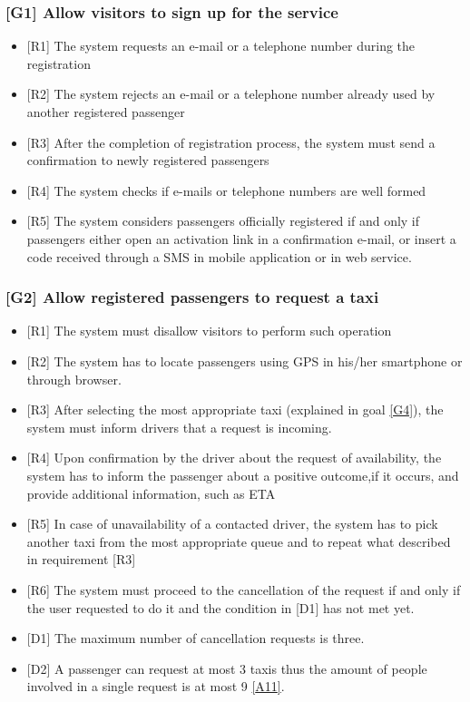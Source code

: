 \documentclass[a4paper,12pt,dvipsnames]{article}%
\begin{document}
\subsubsection{{[}G1{]} Allow visitors to sign up for the service}
\label{goal1}
\begin{itemize}
\item {[}R1{]} The system requests an e-mail or a telephone number during the registration
\item {[}R2{]} The system rejects an e-mail or a telephone number already used by another registered passenger
\item {[}R3{]} After the completion of registration process, the system must send a confirmation to newly registered passengers
\item {[}R4{]} The system checks if e-mails or telephone numbers are well formed
\item {[}R5{]} The system considers passengers officially registered if and only if passengers either open an activation link in a confirmation e-mail, or insert a code received through a SMS in mobile application or in web service.
\end{itemize}
\subsubsection{{[}G2{]} Allow registered passengers to request a taxi}
\label{goal2}
\begin{itemize}
\item {[}R1{]} The system must disallow visitors to perform such operation
\item {[}R2{]} The system has to locate passengers using GPS in his/her smartphone or through browser.
\item {[}R3{]} After selecting the most appropriate taxi (explained in goal \hyperref[goal4]{[G4]}), the system must inform drivers that a request is incoming.
\item {[}R4{]} Upon confirmation by the driver about the request of availability, the system has to inform the passenger about a positive outcome,if it occurs, and provide additional information, such as ETA
\item {[}R5{]} In case of unavailability of a contacted driver, the system has to pick another taxi from the most appropriate queue and to repeat what described in requirement [R3]
\item {[}R6{]} The system must proceed to the cancellation of the request if and only if the user requested to do it and the condition in [D1] has not met yet.
\item {[}D1{]} The maximum number of cancellation requests is three.
\item {[}D2{]} A passenger can request at most 3 taxis thus the amount of people involved in a single request is at most 9 \hyperref[a11]{{[}A11{]}}.
\end{itemize}
\end{document}
